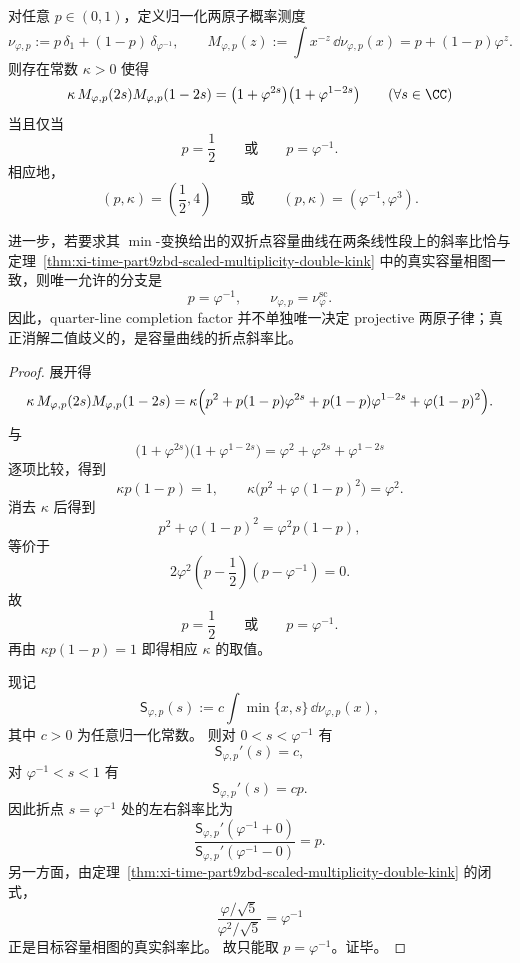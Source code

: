 \begin{theorem}\label{thm:xi-time-part9zbha-completion-branch-capacity-selection}
对任意 \(p\in(0,1)\)，定义归一化两原子概率测度
\[
\nu_{\varphi,p}
:=
p\,\delta_1+(1-p)\,\delta_{\varphi^{-1}},
\qquad
M_{\varphi,p}(z)
:=
\int x^{-z}\,\dd\nu_{\varphi,p}(x)
=
p+(1-p)\varphi^z.
\]
则存在常数 \(\kappa>0\) 使得
\[
\kappa\,M_{\varphi,p}(2s)M_{\varphi,p}(1-2s)
=
\bigl(1+\varphi^{2s}\bigr)\bigl(1+\varphi^{1-2s}\bigr)
\qquad (\forall s\in\CC)
\]
当且仅当
\[
p=\frac12
\qquad\text{或}\qquad
p=\varphi^{-1}.
\]
相应地，
\[
(p,\kappa)=\left(\frac12,4\right)
\qquad\text{或}\qquad
(p,\kappa)=\left(\varphi^{-1},\varphi^3\right).
\]

进一步，若要求其 \(\min\)-变换给出的双折点容量曲线在两条线性段上的斜率比恰与定理~\ref{thm:xi-time-part9zbd-scaled-multiplicity-double-kink} 中的真实容量相图一致，则唯一允许的分支是
\[
p=\varphi^{-1},
\qquad
\nu_{\varphi,p}=\nu_\varphi^{\mathrm{sc}}.
\]
因此，quarter-line completion factor 并不单独唯一决定 projective 两原子律；真正消解二值歧义的，是容量曲线的折点斜率比。
\end{theorem}
\begin{proof}
展开得
\[
\kappa\,M_{\varphi,p}(2s)M_{\varphi,p}(1-2s)
=
\kappa\Bigl(
p^2+p(1-p)\varphi^{2s}+p(1-p)\varphi^{1-2s}+\varphi(1-p)^2
\Bigr).
\]
与
\[
\bigl(1+\varphi^{2s}\bigr)\bigl(1+\varphi^{1-2s}\bigr)
=
\varphi^2+\varphi^{2s}+\varphi^{1-2s}
\]
逐项比较，得到
\[
\kappa p(1-p)=1,
\qquad
\kappa\bigl(p^2+\varphi(1-p)^2\bigr)=\varphi^2.
\]
消去 \(\kappa\) 后得到
\[
p^2+\varphi(1-p)^2=\varphi^2p(1-p),
\]
等价于
\[
2\varphi^2\left(p-\frac12\right)\left(p-\varphi^{-1}\right)=0.
\]
故
\[
p=\frac12
\qquad\text{或}\qquad
p=\varphi^{-1}.
\]
再由 \(\kappa p(1-p)=1\) 即得相应 \(\kappa\) 的取值。

现记
\[
\mathsf S_{\varphi,p}(s)
:=
c\int \min\{x,s\}\,\dd\nu_{\varphi,p}(x),
\]
其中 \(c>0\) 为任意归一化常数。
则对 \(0<s<\varphi^{-1}\) 有
\[
\mathsf S_{\varphi,p}'(s)=c,
\]
对 \(\varphi^{-1}<s<1\) 有
\[
\mathsf S_{\varphi,p}'(s)=cp.
\]
因此折点 \(s=\varphi^{-1}\) 处的左右斜率比为
\[
\frac{\mathsf S_{\varphi,p}'(\varphi^{-1}+0)}{\mathsf S_{\varphi,p}'(\varphi^{-1}-0)}=p.
\]
另一方面，由定理~\ref{thm:xi-time-part9zbd-scaled-multiplicity-double-kink} 的闭式，
\[
\frac{\varphi/\sqrt5}{\varphi^2/\sqrt5}=\varphi^{-1}
\]
正是目标容量相图的真实斜率比。
故只能取 \(p=\varphi^{-1}\)。证毕。
\end{proof}

